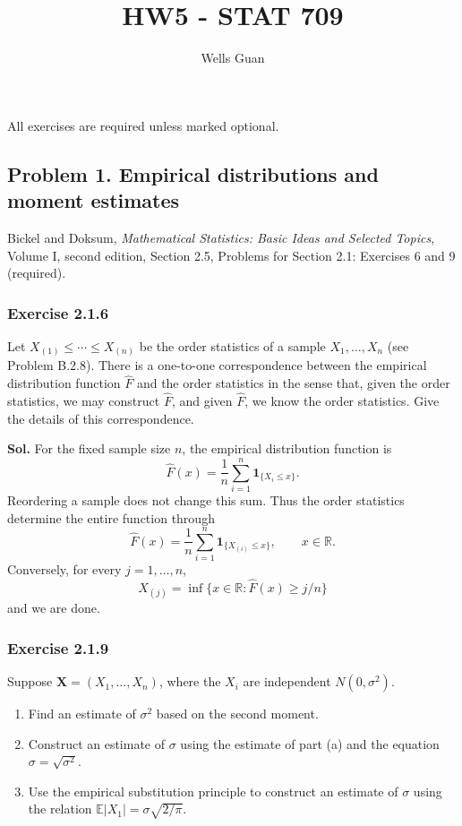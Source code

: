 \documentclass[lang=en,11pt,a4paper,citestyle=authoryear]{elegantpaper}
\title{HW5 - STAT 709}
\author{Wells Guan}
\newcommand{\R}{\mathbb{R}}
\newcommand{\E}{\mathbb{E}}
\begin{document}
\maketitle

\noindent All exercises are required unless marked optional.

\subsection*{Problem 1. Empirical distributions and moment estimates}
Bickel and Doksum, \textit{Mathematical Statistics: Basic Ideas and
Selected Topics}, Volume I, second edition, Section 2.5,
Problems for Section 2.1: Exercises 6 and 9 (required).

\subsubsection*{Exercise 2.1.6}
Let $X_{(1)}\le\cdots\le X_{(n)}$ be the order statistics of a
sample $X_1,\ldots,X_n$ (see Problem B.2.8). There is a one-to-one
correspondence between the empirical distribution function $\widehat F$
and the order statistics in the sense that, given the order statistics,
we may construct $\widehat F$, and given $\widehat F$, we know the
order statistics. Give the details of this correspondence.

\par\vspace{0.5em}\noindent\textbf{Sol.}
For the fixed sample size $n$, the empirical distribution function is
\[
\widehat F(x)=\frac1n\sum_{i=1}^n\mathbf1_{\{X_i\le x\}}.
\]
Reordering a sample does not change this sum. Thus the order statistics
determine the entire function through
\[
{\widehat F(x)
=\frac1n\sum_{i=1}^n\mathbf1_{\{X_{(i)}\le x\}},\qquad x\in\R.}
\]
Conversely, for every $j=1,\ldots,n$,
\[
{X_{(j)}=\inf\{x\in\R:\widehat F(x)\ge j/n\}}
\]
and we are done.

\subsubsection*{Exercise 2.1.9}
Suppose $\mathbf X=(X_1,\ldots,X_n)$, where the $X_i$ are independent
$N(0,\sigma^2)$.
\begin{enumerate}[label=(\alph*),leftmargin=*]
\item Find an estimate of $\sigma^2$ based on the second moment.
\item Construct an estimate of $\sigma$ using the estimate of part (a)
and the equation $\sigma=\sqrt{\sigma^2}$.
\item Use the empirical substitution principle to construct an estimate
of $\sigma$ using the relation $\E|X_1|=\sigma\sqrt{2/\pi}$.
\end{enumerate}
\end{document}
